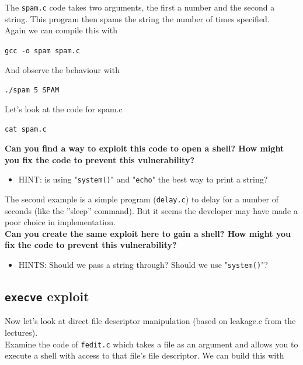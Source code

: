 \documentclass{article}
\begin{document}
\noindent The \lstinline{spam.c} code takes two arguments, the first a number and the second a string. This program then spams the string the number of times specified.\\

\noindent Again we can compile this with

\begin{center}
    \lstinline{gcc -o spam spam.c}
\end{center}
\noindent And observe the behaviour with
\begin{center}
    \lstinline{./spam 5 SPAM}
\end{center}
\noindent Let’s look at the code for spam.c
\begin{center}
    \lstinline{cat spam.c}
\end{center}

\noindent\textbf{Can you find a way to exploit this code to open a shell? How might you fix the code to prevent this vulnerability?}
\begin{itemize}
    \item HINT: is using "\lstinline{system()}" and "\lstinline{echo}" the best way to print a string?
\end{itemize}

\noindent The second example is a simple program (\lstinline{delay.c}) to delay for a number
of seconds (like the ”sleep” command). But it seems the developer may have
made a poor choice in implementation.\\

\noindent \textbf{Can you create the same exploit here to gain a shell? How might you fix the code to prevent this vulnerability?}
\begin{itemize}
    \item HINTS: Should we pass a string through? Should we use "\lstinline{system()}"?
\end{itemize}

\subsection{\lstinline{execve} exploit}
Now let’s look at direct file descriptor manipulation (based on leakage.c from
the lectures).\\


\noindent Examine the code of \lstinline{fedit.c} which takes a file as an argument and allows
you to execute a shell with access to that file’s file descriptor. We can build
this with
\end{document}
